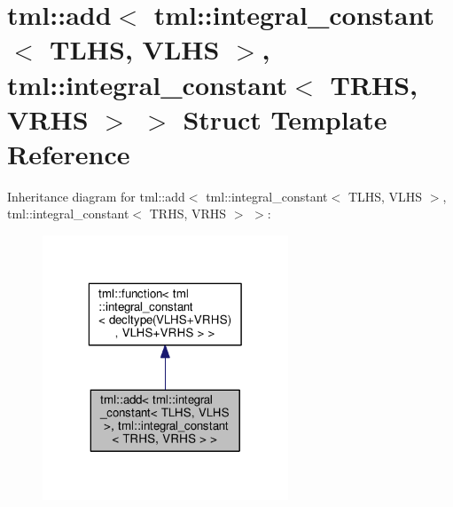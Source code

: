 \hypertarget{structtml_1_1add_3_01tml_1_1integral__constant_3_01_t_l_h_s_00_01_v_l_h_s_01_4_00_01tml_1_1integ3717a3af50ee3d1defcce3a5c06c5313}{\section{tml\+:\+:add$<$ tml\+:\+:integral\+\_\+constant$<$ T\+L\+H\+S, V\+L\+H\+S $>$, tml\+:\+:integral\+\_\+constant$<$ T\+R\+H\+S, V\+R\+H\+S $>$ $>$ Struct Template Reference}
\label{structtml_1_1add_3_01tml_1_1integral__constant_3_01_t_l_h_s_00_01_v_l_h_s_01_4_00_01tml_1_1integ3717a3af50ee3d1defcce3a5c06c5313}
}


Inheritance diagram for tml\+:\+:add$<$ tml\+:\+:integral\+\_\+constant$<$ T\+L\+H\+S, V\+L\+H\+S $>$, tml\+:\+:integral\+\_\+constant$<$ T\+R\+H\+S, V\+R\+H\+S $>$ $>$\+:
\nopagebreak
\begin{figure}[H]
\begin{center}
\leavevmode
\includegraphics[width=208pt]{structtml_1_1add_3_01tml_1_1integral__constant_3_01_t_l_h_s_00_01_v_l_h_s_01_4_00_01tml_1_1integ46ffb8c2e7f0e3c702d14b7ef0c20ecd}
\end{center}
\end{figure}


